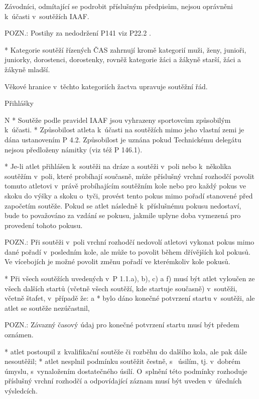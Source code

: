   Závodníci, odmítající se podrobit příslušným předpisům, nejsou oprávněni k~účasti v~soutěžích IAAF.
  
  POZN.: Postihy za nedodržení P141 viz P22.2 .

* Kategorie soutěží řízených ČAS zahrnují kromě kategorií muži, ženy, junioři, juniorky, dorostenci, dorostenky, rovněž kategorie žáci a žákyně starší, žáci a žákyně mladší.

Věkové hranice v~těchto kategoriích žactva upravuje soutěžní řád.

\secc Přihlášky

\begitems \style N
* Soutěže podle pravidel IAAF jsou vyhrazeny sportovcům způsobilým k~účasti.
* Způsobilost atleta k~účasti na soutěžích mimo jeho vlastní zemi je dána ustanovením P 4.2. Způsobilost je uznána pokud Technickému delegátu nejsou předloženy námitky (viz též P 146.1).

* Je-li atlet přihlášen k~soutěži na dráze a soutěži v~poli nebo k~několika soutěžím v~poli, které probíhají současně, může příslušný vrchní rozhodčí povolit tomuto atletovi v~právě probíhajícím soutěžním kole nebo pro každý pokus ve skoku do výšky a skoku o~tyči, provést tento pokus mimo pořadí stanovené před započetím soutěže. Pokud se atlet následně k~příslušnému pokusu nedostaví, bude to považováno za vzdání se pokusu, jakmile uplyne doba vymezená pro provedení tohoto pokusu.

POZN.: Při soutěži v~poli vrchní rozhodčí nedovolí atletovi vykonat pokus mimo dané pořadí v~posledním kole, ale může to povolit během dřívějších kol pokusů. Ve vícebojích je možné povolit změnu pořadí ve kterémkoliv kole pokusů.

* Při všech soutěžích uvedených v~P 1.1.a), b), c) a f) musí být atlet vyloučen ze všech dalších startů (včetně všech soutěží, kde startuje současně) v~soutěži, včetně štafet, v~případě že:
  \begitems \style a
  * bylo dáno konečné potvrzení startu v~soutěži, ale atlet se soutěže nezúčastnil,

  POZN.: Závazný časový údaj pro konečné potvrzení startu musí být předem oznámen.

  * atlet postoupil z~kvalifikační soutěže či rozběhu do dalšího kola, ale pak dále nesoutěžil;
  * atlet nesplnil podmínku soutěžit čestně, s~ úsilím, tj. v~dobrém úmyslu, s~vynaložením dostatečného úsilí. O~splnění této podmínky rozhoduje příslušný vrchní rozhodčí a odpovídající záznam musí být uveden v~úředních výsledcích.

